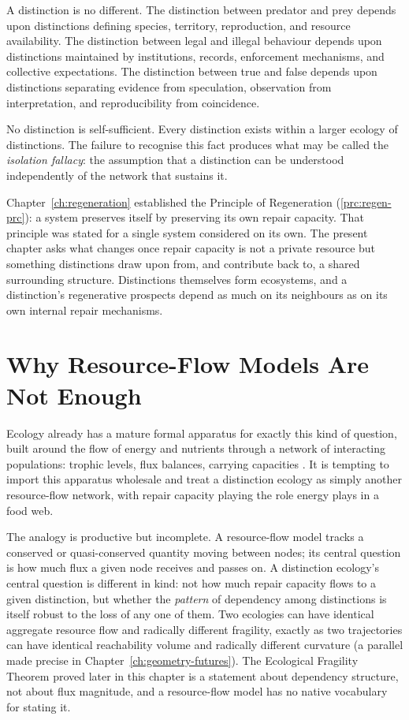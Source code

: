 \documentclass[12pt,twoside,openright]{book}
\begin{document}
A distinction is no different. The distinction between
predator and prey depends upon distinctions defining
species, territory, reproduction, and resource
availability. The distinction between legal and illegal
behaviour depends upon distinctions maintained by
institutions, records, enforcement mechanisms, and
collective expectations. The distinction between true and
false depends upon distinctions separating evidence from
speculation, observation from interpretation, and
reproducibility from coincidence.

No distinction is self-sufficient. Every distinction exists
within a larger ecology of distinctions. The failure to
recognise this fact produces what may be called the
\emph{isolation fallacy}: the assumption that a distinction
can be understood independently of the network that
sustains it.

Chapter~\ref{ch:regeneration} established the Principle of
Regeneration (\cref{prc:regen-prc}): a system preserves
itself by preserving its own repair capacity. That principle
was stated for a single system considered on its own. The
present chapter asks what changes once repair capacity is
not a private resource but something distinctions draw upon
from, and contribute back to, a shared surrounding structure.
Distinctions themselves form ecosystems, and a distinction's
regenerative prospects depend as much on its neighbours as
on its own internal repair mechanisms.

\section{Why Resource-Flow Models Are Not Enough}
\label{sec:ch12-resource-flow}

Ecology already has a mature formal apparatus for exactly
this kind of question, built around the flow of energy and
nutrients through a network of interacting populations:
trophic levels, flux balances, carrying capacities
\parencite{holling1973}. It is tempting to import this
apparatus wholesale and treat a distinction ecology as simply
another resource-flow network, with repair capacity playing
the role energy plays in a food web.

The analogy is productive but incomplete. A resource-flow
model tracks a conserved or quasi-conserved quantity moving
between nodes; its central question is how much flux a given
node receives and passes on. A distinction ecology's central
question is different in kind: not how much repair capacity
flows to a given distinction, but whether the \emph{pattern}
of dependency among distinctions is itself robust to the loss
of any one of them. Two ecologies can have identical aggregate
resource flow and radically different fragility, exactly as
two trajectories can have identical reachability volume and
radically different curvature (a parallel made precise in
Chapter~\ref{ch:geometry-futures}). The Ecological Fragility
Theorem proved later in this chapter is a statement about
dependency structure, not about flux magnitude, and a
resource-flow model has no native vocabulary for stating it.
\end{document}

